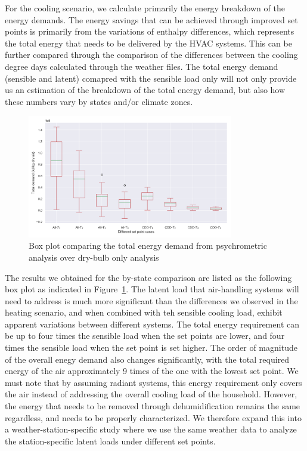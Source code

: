 For the cooling scenario, we calculate primarily the energy breakdown of the energy demands. The energy savings that can be achieved through improved set points is primarily from the variations of enthalpy differences, which represents the total energy that needs to be delivered by the HVAC systems. This can be further compared through the comparison of the differences between the cooling degree days calculated through the weather files. The total energy demand (sensible and latent) comapred with the sensible load only will not only provide us an estimation of the breakdown of the total energy demand, but also how these numbers vary by states and/or climate zones. 
	\begin{figure}[h!]
	\centering
	\includegraphics[width=0.8\textwidth]{coolheat.png}
	\caption{Box plot comparing the total energy demand from psychrometric analysis over dry-bulb only analysis}\label{fg:coolall}
	\end{figure}
The results we obtained for the by-state comparison are listed as the following box plot as indicated in Figure~\ref{fg:coolall}. The latent load that air-handling systems will need to address is much more significant than the differences we observed in the heating scenario, and when combined with teh sensible cooling load, exhibit apparent variations between different systems. The total energy requirement can be up to four times the sensible load when the set points are lower, and four times the sensible load when the set point is set higher. The order of magnitude of the overall enegy demand also changes significantly, with the total required energy of the air approximately 9 times of the one with the lowest set point. We must note that by assuming radiant systems, this energy requirement only covers the air instead of addressing the overall cooling load of the household. However, the energy that needs to be removed through dehumidification remains the same regardless, and needs to be properly characterized. We therefore expand this into a weather-station-specific study where we use the same weather data to analyze the station-specific latent loads under different set points. 

